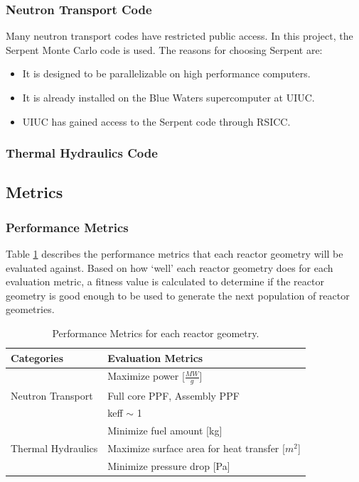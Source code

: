 \subsubsection{Neutron Transport Code}
Many neutron transport codes have restricted public access. 
In this project, the Serpent Monte Carlo code is used. 
The reasons for choosing Serpent are: 
\begin{itemize}
    \item It is designed to be parallelizable on high performance 
    computers. 
    \item It is already installed on the Blue Waters supercomputer at UIUC. 
    \item UIUC has gained access to the Serpent code through RSICC. 
\end{itemize}

\subsubsection{Thermal Hydraulics Code}

\subsection{Metrics}

\subsubsection{Performance Metrics}
Table \ref{tab:eval-metric} describes the performance metrics that each 
reactor geometry will be evaluated against. 
Based on how `well' each reactor geometry does for each evaluation metric, 
a fitness value is calculated to determine if the reactor geometry is good 
enough to be used to generate the next population of reactor geometries. 

\begin{table}[!htbp]
    \caption{Performance Metrics for each reactor geometry.}
    \label{tab:eval-metric}
    \centering
    \doublespacing
    \small
    \begin{tabular}{ll}
    \hline
    \textbf{Categories} & \textbf{Evaluation Metrics}\\ \hline
    & Maximize power [$\frac{MW}{g}$] \\
    Neutron Transport & Full core \gls{PPF}, Assembly \gls{PPF} \\ 
    & keff $\sim$ 1 \\ 
    & Minimize fuel amount [kg] \\ \hline
    Thermal Hydraulics & Maximize surface area for heat transfer [$m^2$]\\ 
    & Minimize pressure drop [Pa]\\ \hline 
    \end{tabular}
\end{table}

